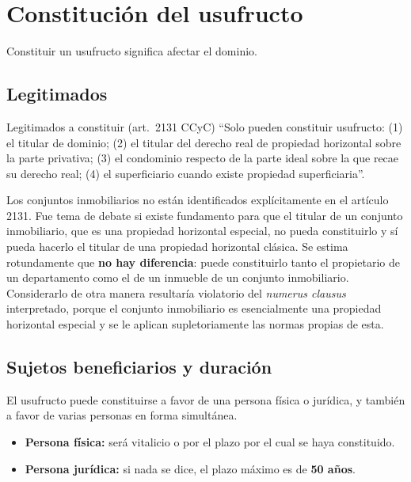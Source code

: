 \documentclass[12pt,oneside]{book}
\begin{document}
\section{Constitución del usufructo}

Constituir un usufructo significa afectar el dominio.

\subsection{Legitimados}

\begin{definition}{Legitimados a constituir (art.~2131 CCyC)}
``Solo pueden constituir usufructo: (1) el titular de dominio; (2) el titular del derecho real de propiedad horizontal sobre la parte privativa; (3) el condominio respecto de la parte ideal sobre la que recae su derecho real; (4) el superficiario cuando existe propiedad superficiaria''.
\end{definition}

Los conjuntos inmobiliarios no están identificados explícitamente en el artículo 2131. Fue tema de debate si existe fundamento para que el titular de un conjunto inmobiliario, que es una propiedad horizontal especial, no pueda constituirlo y sí pueda hacerlo el titular de una propiedad horizontal clásica. Se estima rotundamente que \textbf{no hay diferencia}: puede constituirlo tanto el propietario de un departamento como el de un inmueble de un conjunto inmobiliario. Considerarlo de otra manera resultaría violatorio del \textit{numerus clausus} interpretado, porque el conjunto inmobiliario es esencialmente una propiedad horizontal especial y se le aplican supletoriamente las normas propias de esta.

\subsection{Sujetos beneficiarios y duración}

El usufructo puede constituirse a favor de una persona física o jurídica, y también a favor de varias personas en forma simultánea.

\begin{itemize}
    \item \textbf{Persona física:} será vitalicio o por el plazo por el cual se haya constituido.
    \item \textbf{Persona jurídica:} si nada se dice, el plazo máximo es de \textbf{50 años}.
\end{itemize}
\end{document}
